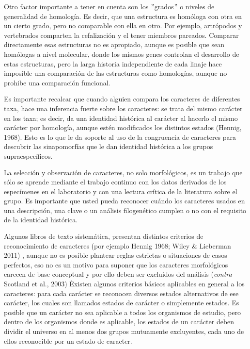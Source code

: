 Otro factor importante a tener en cuenta son los $"$grados$"$ o 
niveles de generalidad de homolog\'ia. Es decir, que una estructura 
es hom\'ologa con otra en un cierto grado, pero no comparable con 
ella en otro. Por ejemplo, artr\'opodos y vertebrados comparten la 
cefalizaci\'on y el tener miembros pareados. Comparar directamente 
esas estructuras no es apropiado, aunque es posible que sean 
hom\'ologas a nivel molecular, donde los mismos genes controlan el 
desarrollo de estas estructuras, pero la larga historia 
independiente de cada linaje hace imposible una comparaci\'on de las 
estructuras como homolog\'ias, aunque no prohibe una comparaci\'on 
funcional. 

Es importante recalcar que cuando alguien compara los 
caracteres de diferentes taxa, hace una inferencia fuerte sobre los 
caracteres: se trata del mismo car\'acter en los taxa; es decir, da 
una identidad hist\'orica al car\'acter al hacerlo el mismo car\'acter 
por homolog\'ia, aunque est\'en modificados los distintos 
estados \cite{kluge2002} (Hennig, 1968). Esto es lo que le da soporte al 
uso de la congruencia de caracteres para descubrir las sinapomorf\'
ias que le dan identidad hist\'orica a los grupos supraespec\'ificos.

 
La selecci\'on y observaci\'on de caracteres, no solo morfol\'ogicos, es un trabajo que s\'olo se aprende mediante el trabajo continuo con los datos derivados de los espec\'imenes en el laboratorio y con una lectura cr\'itica de la literatura sobre el grupo. Es importante que usted pueda reconocer cu\'ando los caracteres usados en una descripci\'on, una clave o un an\'alisis filogen\'etico cumplen o no con el requisito de la identidad hist\'orica.


Algunos libros de texto  sistem\'atica, presentan distintos criterios de reconocimiento de caracteres (por ejemplo Hennig 1968; Wiley \&  Lieberman 2011) \cite{wiley2011}, aunque no es posible plantear reglas estrictas o situaciones de casos perfectos, eso no es un motivo para suponer que los caracteres morfol\'ogicos carecen de base conceptual y por ello deben ser excluidos del an\'alisis (\textit{contra} Scotland et al., 2003) \cite{Scotland2003}\.

Existen algunos criterios b\'asicos aplicables en general a los caracteres: para cada car\'acter se reconocen diversos estados alternativos de ese car\'acter, los cuales son llamados estados de car\'acter o simplemente estados. Es posible que un car\'acter no sea aplicable a todos los organismos de estudio, pero dentro de los organismos donde es aplicable, los estados de un car\'acter deben dividir el universo en al menos dos grupos mutuamente excluyentes, cada uno de ellos reconocible por un estado de caracter.



